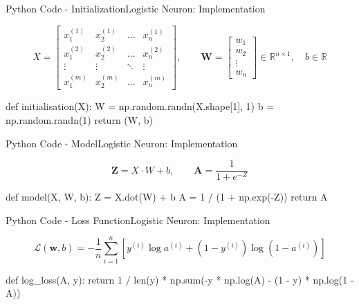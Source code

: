\documentclass[aspectratio=169]{beamer}
\begin{document}
%
%
\begin{frame}[fragile]{Python Code - Initialization}{Logistic Neuron: Implementation}
    
    \vspace{0.2cm}
    \[
    X = 
    \begin{bmatrix}
    x_1^{(1)} & x_2^{(1)} & \dots & x_n^{(1)} \\
    x_1^{(2)} & x_2^{(2)} & \dots & x_n^{(2)} \\
    \vdots & \vdots & \ddots & \vdots \\
    x_1^{(m)} & x_2^{(m)} & \dots & x_n^{(m)}
    \end{bmatrix} 
    , \quad \quad
    \bm{W} = 
    \begin{bmatrix}
    w_1 \\ w_2 \\ \vdots \\ w_n
    \end{bmatrix} 
    \in \mathbb{R}^{n \times 1}, 
    \quad b \in \mathbb{R}
    \]

    \vspace{0.5cm}
    \begin{codebox}
def initialisation(X):
    W = np.random.randn(X.shape[1], 1)
    b = np.random.randn(1)
    return (W, b)
    \end{codebox}

\end{frame}
%
%
\begin{frame}[fragile]{Python Code - Model}{Logistic Neuron: Implementation}
    
    \vspace{0.2cm}
    \[
    \bm{Z} = X \cdot W + b 
    , \quad \quad
    \bm{A} = \frac{1}{1+e^{-Z}}
    \]

    \vspace{0.5cm}
    \begin{codebox}
def model(X, W, b):
    Z = X.dot(W) + b
    A = 1 / (1 + np.exp(-Z))
    return A
    \end{codebox}

\end{frame}
%
%
\begin{frame}[fragile]{Python Code - Loss Function}{Logistic Neuron: Implementation}
    
    \vspace{0.2cm}
    \[
    \mathcal{L}(\mathbf{w}, b) = -\frac{1}{n} \sum\limits_{i=1}^n \left[ y^{(i)} \log a^{(i)} + (1 - y^{(i)}) \log(1 - a^{(i)}) \right]
    \]

    \vspace{0.5cm}
    \begin{codebox}
def log_loss(A, y):
    return 1 / len(y) * np.sum(-y * np.log(A) - (1 - y) * np.log(1 - A))
    \end{codebox}

\end{frame}
\end{document}
